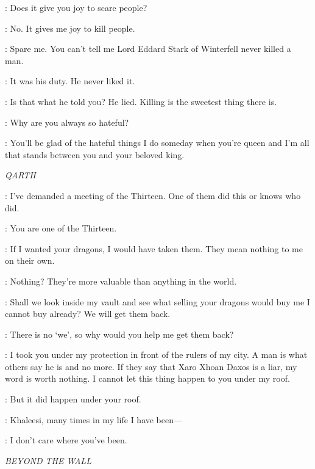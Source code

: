 \SANSA: Does it give you joy to scare people?

\HOUND: No. It gives me joy to kill people.


\HOUND: Spare me. You can't tell me Lord Eddard Stark of Winterfell never killed a man.

\SANSA: It was his duty. He never liked it.

\HOUND: Is that what he told you? He lied. Killing is the sweetest thing there is.

\SANSA: Why are you always so hateful?

\HOUND: You'll be glad of the hateful things I do someday when you're queen and I'm all that stands between you and your beloved king.



\scene

\textit{QARTH}


\XARO: I've demanded a meeting of the Thirteen. One of them did this or knows who did.

\DAENERYS: You are one of the Thirteen.

\XARO: If I wanted your dragons, I would have taken them. They mean nothing to me on their own.

\DAENERYS: Nothing? They're more valuable than anything in the world.

\XARO: Shall we look inside my vault and see what selling your dragons would buy me I cannot buy already? We will get them back.

\DAENERYS: There is no `we', so why would you help me get them back?

\XARO: I took you under my protection in front of the rulers of my city. A man is what others say he is and no more. If they say that Xaro Xhoan Daxos is a liar, my word is worth nothing. I cannot let this thing happen to you under my roof.

\DAENERYS: But it did happen under your roof.

\XARO: Khaleesi, many times in my life I have been---

\DAENERYS: I don't care where you've been.


\scene

\textit{BEYOND THE WALL}

